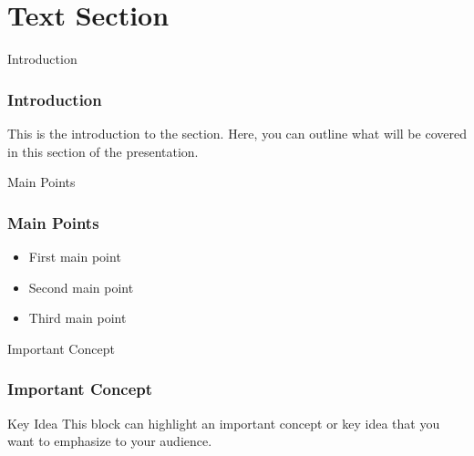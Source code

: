 \section{Text Section}
\label{text_section}


\begin{frame}{Introduction} %
    \frametitle{Introduction}
    This is the introduction to the section. Here, you can outline what will be covered in this section of the presentation.
\end{frame}

\begin{frame}{Main Points}
    \frametitle{Main Points}
    \begin{itemize}
        \item First main point
        \item Second main point
        \item Third main point
    \end{itemize}
\end{frame}


\begin{frame}{Important Concept}
    \frametitle{Important Concept}
    \begin{block}{Key Idea}
        This block can highlight an important concept or key idea that you want to emphasize to your audience.
    \end{block}
\end{frame}